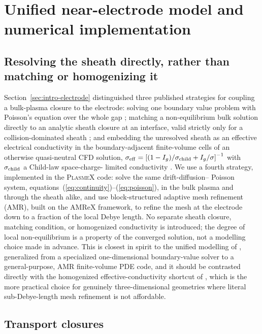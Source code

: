 \section{Unified near-electrode model and numerical implementation}
\label{sec:methods}

\subsection{Resolving the sheath directly, rather than matching or
homogenizing it}
\label{sec:methods-strategy}

Section~\ref{sec:intro-electrode} distinguished three published strategies
for coupling a bulk-plasma closure to the electrode: solving one boundary
value problem with Poisson's equation over the whole gap
\cite{Almeida2008}; matching a non-equilibrium bulk solution directly to an
analytic sheath closure at an interface, valid strictly only for a
collision-dominated sheath \cite{Benilov2016}; and embedding the
unresolved sheath as an effective electrical conductivity in the
boundary-adjacent finite-volume cells of an otherwise quasi-neutral CFD
solution, $\sigma_{\rm eff} = \left[(1-I_g)/\sigma_{\rm child} +
I_g/\sigma\right]^{-1}$ with $\sigma_{\rm child}$ a Child-law space-charge-
limited conductivity \cite{LiangTrelles}. We use a fourth strategy,
implemented in the \textsc{PlasmeX} code: solve the same drift-diffusion--
Poisson system, equations~(\ref{eq:continuity})--(\ref{eq:poisson}), in the
bulk plasma and through the sheath alike, and use block-structured adaptive
mesh refinement (AMR), built on the AMReX framework, to refine the mesh at
the electrode down to a fraction of the local Debye length. No separate
sheath closure, matching condition, or homogenized conductivity is
introduced; the degree of local non-equilibrium is a property of the
converged solution, not a modelling choice made in advance. This is closest
in spirit to the unified modelling of \cite{Almeida2008}, generalized from
a specialized one-dimensional boundary-value solver to a general-purpose,
AMR finite-volume PDE code, and it should be contrasted directly with the
homogenized effective-conductivity shortcut of \cite{LiangTrelles}, which
is the more practical choice for genuinely three-dimensional geometries
where literal sub-Debye-length mesh refinement is not affordable.

\subsection{Transport closures}
\label{sec:methods-transport}

